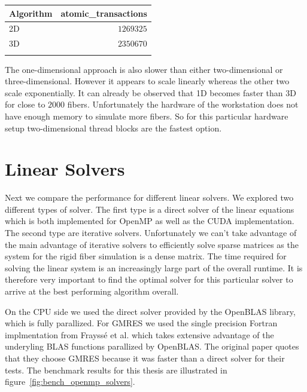 \documentclass[a4paper,11pt]{kth-mag}
\begin{document}
\begin{center}
  \begin{tabulary}{0.7\textwidth}{LR}
    \toprule
    Algorithm & atomic\_transactions \\
    \midrule
    2D & $1269325$ \\
    3D & $2350670$ \\
    \bottomrule
    \label{tab:atomic_transactions}
  \end{tabulary}
\end{center}

The one-dimensional approach is also slower than either two-dimensional or three-dimensional. However it appears to scale linearly whereas the other two scale exponentially. It can already be observed that 1D becomes faster than 3D for close to $2000$ fibers. Unfortunately the hardware of the workstation does not have enough memory to simulate more fibers. So for this particular hardware setup two-dimensional thread blocks are the fastest option.

\section{Linear Solvers}

Next we compare the performance for different linear solvers. We explored two different types of solver. The first type is a direct solver of the linear equations which is both implemented for OpenMP as well as the CUDA implementation. The second type are iterative solvers. Unfortunately we can't take advantage of the main advantage of iterative solvers to efficiently solve sparse matrices as the system for the rigid fiber simulation is a dense matrix. The time required for solving the linear system is an increasingly large part of the overall runtime. It is therefore very important to find the optimal solver for this particular solver to arrive at the best performing algorithm overall.

On the CPU side we used the direct solver provided by the OpenBLAS library, which is fully parallized. For GMRES we used the single precision Fortran implmentation from Frayssé et al. which takes extensive advantage of the underyling BLAS functions parallized by OpenBLAS. The original paper quotes that they choose GMRES because it was faster than a direct solver for their tests. The benchmark results for this thesis are illustrated in figure~\ref{fig:bench_openmp_solvers}.
\end{document}
